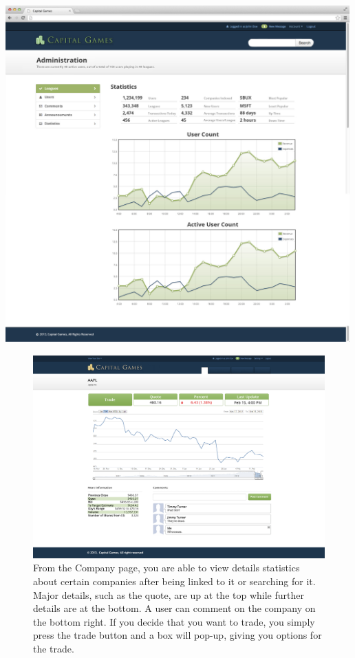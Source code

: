 \includegraphics[width=500px]{./mockups/JPEG/adminstatistics.jpg}

\begin{figure}
\centering
\includegraphics[width=5.5in]{./mockups/JPEG/company.jpg}
\caption{From the Company page, you are able to view details statistics about certain companies after being linked to it or searching for it. Major details, such as the quote, are up at the top while further details are at the bottom. A user can comment on the company on the bottom right. If you decide that you want to trade, you simply press the trade button and a box will pop-up, giving you options for the trade.}
\end{figure}

